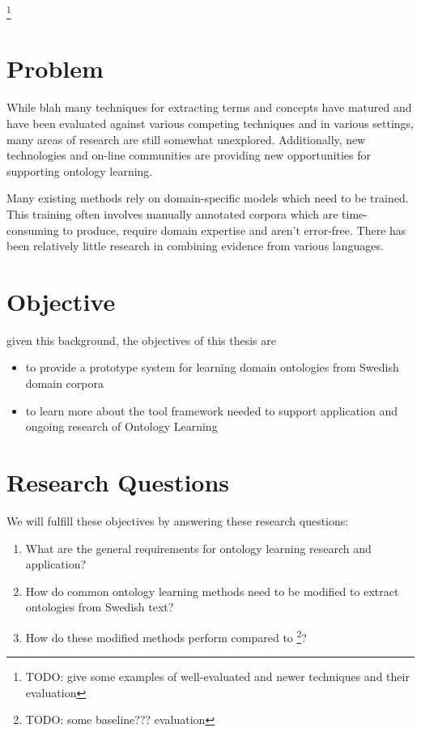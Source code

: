 \documentclass[a4paper]{report}
\newcommand{\todo}[1]{\footnote{{\color{red} TODO: #1}}}
\begin{document}
\todo{give some examples of well-evaluated and newer techniques and their evaluation}

\section{Problem}

While blah many techniques for extracting terms and concepts have matured and have been evaluated against various competing techniques and in various settings, many areas of research are still somewhat unexplored.
Additionally, new technologies and on-line communities are providing new opportunities for supporting ontology learning.

Many existing methods rely on domain-specific models which need to be trained.
This training often involves manually annotated corpora which are time-consuming to produce, require domain expertise and aren't error-free.
There has been relatively little research in combining evidence from various languages.

\section{Objective}

given this background, the objectives of this thesis are

\begin{itemize}
  \item to provide a prototype system for learning domain ontologies from Swedish domain corpora
  \item to learn more about the tool framework needed to support application and ongoing research of Ontology Learning
\end{itemize}

\section{Research Questions}

We will fulfill these objectives by answering these research questions:

\begin{enumerate}
  \item{What are the general requirements for ontology learning research and application?}
  \item{How do common ontology learning methods need to be modified to extract ontologies from Swedish text?}
  \item{How do these modified methods perform compared to \todo{some baseline??? evaluation}?}
\end{enumerate}
\end{document}
